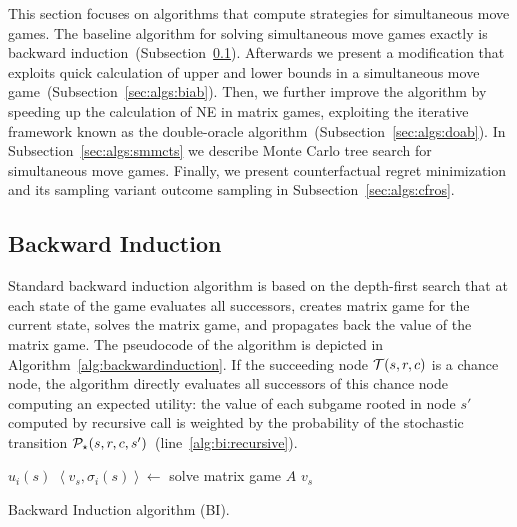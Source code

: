 
This section focuses on algorithms that compute strategies for simultaneous move games.
The baseline algorithm for solving simultaneous move games exactly is backward induction~(Subsection~\ref{sec:algs:bi}).
Afterwards we present a modification that exploits quick calculation of upper and lower bounds in a simultaneous move game~(Subsection~\ref{sec:algs:biab}).
Then, we further improve the algorithm by speeding up the calculation of NE in matrix games, exploiting the iterative framework known as the double-oracle algorithm~(Subsection~\ref{sec:algs:doab}).
In Subsection~\ref{sec:algs:smmcts} we describe Monte Carlo tree search for simultaneous move games.
Finally, we present counterfactual regret minimization and its sampling variant outcome sampling in Subsection~\ref{sec:algs:cfros}.


\subsection{Backward Induction}\label{sec:algs:bi}

Standard backward induction algorithm is based on the depth-first search that at each state of the game evaluates all successors, creates matrix game for the current state, solves the matrix game, and propagates back the value of the matrix game. The pseudocode of the algorithm is depicted in Algorithm~\ref{alg:backwardinduction}. If the succeeding node $\mathcal{T}(s,r,c)$ is a chance node, the algorithm directly evaluates all successors of this chance node computing an expected utility: the value of each subgame rooted in node $s'$ computed by recursive call is weighted by the probability of the stochastic transition $\mathcal{P}_\star(s,r,c,s')$~(line~\ref{alg:bi:recursive}).

\begin{algorithm2e}[t]
\small
{}
 {\Return $u_i(s)$} \label{alg:bi:stop1}
$\left\langle v_s, \sigma_i(s) \right\rangle \leftarrow$ solve matrix game $A$\;  \label{alg:bi:solve}
\Return $v_s$ \label{alg:bi:stop2}
\caption{Backward Induction algorithm (BI).}\label{alg:backwardinduction}
\end{algorithm2e}

